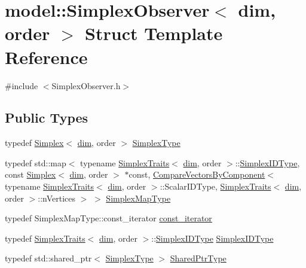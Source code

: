 \hypertarget{structmodel_1_1_simplex_observer}{}\section{model\+:\+:Simplex\+Observer$<$ dim, order $>$ Struct Template Reference}
\label{structmodel_1_1_simplex_observer}


{\ttfamily \#include $<$Simplex\+Observer.\+h$>$}

\subsection*{Public Types}
\begin{DoxyCompactItemize}
\item 
typedef \hyperlink{classmodel_1_1_simplex}{Simplex}$<$ \hyperlink{plot_nd_a_8m_a382f3ca768b275b8d563604f7fc7df73}{dim}, order $>$ \hyperlink{structmodel_1_1_simplex_observer_a9cfe0e538763ae3802d2a9c011b3c061}{Simplex\+Type}
\item 
typedef std\+::map$<$ typename \hyperlink{structmodel_1_1_simplex_traits}{Simplex\+Traits}$<$ \hyperlink{plot_nd_a_8m_a382f3ca768b275b8d563604f7fc7df73}{dim}, order $>$\+::\hyperlink{structmodel_1_1_simplex_observer_a270d41a2f2b7393f03651f9900b62c0b}{Simplex\+I\+D\+Type}, const \hyperlink{classmodel_1_1_simplex}{Simplex}$<$ \hyperlink{plot_nd_a_8m_a382f3ca768b275b8d563604f7fc7df73}{dim}, order $>$ $\ast$const, \hyperlink{structmodel_1_1_compare_vectors_by_component}{Compare\+Vectors\+By\+Component}$<$ typename \hyperlink{structmodel_1_1_simplex_traits}{Simplex\+Traits}$<$ \hyperlink{plot_nd_a_8m_a382f3ca768b275b8d563604f7fc7df73}{dim}, order $>$\+::Scalar\+I\+D\+Type, \hyperlink{structmodel_1_1_simplex_traits}{Simplex\+Traits}$<$ \hyperlink{plot_nd_a_8m_a382f3ca768b275b8d563604f7fc7df73}{dim}, order $>$\+::n\+Vertices $>$ $>$ \hyperlink{structmodel_1_1_simplex_observer_a220336a365d54235796aef669aebbf45}{Simplex\+Map\+Type}
\item 
typedef Simplex\+Map\+Type\+::const\+\_\+iterator \hyperlink{structmodel_1_1_simplex_observer_ad8c54de1bc215fcd2e8ac226fd69fe5c}{const\+\_\+iterator}
\item 
typedef \hyperlink{structmodel_1_1_simplex_traits}{Simplex\+Traits}$<$ \hyperlink{plot_nd_a_8m_a382f3ca768b275b8d563604f7fc7df73}{dim}, order $>$\+::\hyperlink{structmodel_1_1_simplex_observer_a270d41a2f2b7393f03651f9900b62c0b}{Simplex\+I\+D\+Type} \hyperlink{structmodel_1_1_simplex_observer_a270d41a2f2b7393f03651f9900b62c0b}{Simplex\+I\+D\+Type}
\item 
typedef std\+::shared\+\_\+ptr$<$ \hyperlink{structmodel_1_1_simplex_observer_a9cfe0e538763ae3802d2a9c011b3c061}{Simplex\+Type} $>$ \hyperlink{structmodel_1_1_simplex_observer_a8e2b7dce7a23bc6c4cdf87b7d606ca2b}{Shared\+Ptr\+Type}
\end{DoxyCompactItemize}
